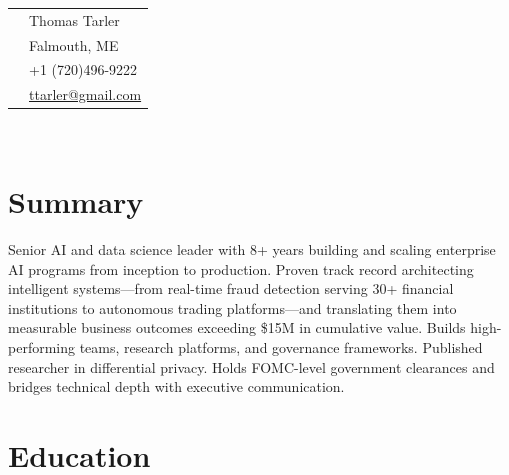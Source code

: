 \documentclass[9pt]{article} %
\begin{document}
\hfill
\begin{minipage}[t]{0.40\textwidth} %
\vspace{0pt} %


\colorbox{shade}{\textcolor{text}{
\begin{tabular}{c|p{5.5cm}}
\raisebox{-4pt}{} & Thomas Tarler \\ %
\raisebox{-4pt}{} & Falmouth, ME\\ %
\raisebox{-3pt}{} & +1 (720)496-9222 \\ %
\raisebox{-1pt}{} & \href{mailto:ttarler@gmail.com}{ttarler@gmail.com} \\ %
\end{tabular}
}
}\\[6pt]


\section{Summary} 

Senior AI and data science leader with 8+ years building and scaling enterprise AI programs from inception to production. Proven track record architecting intelligent systems---from real-time fraud detection serving 30+ financial institutions to autonomous trading platforms---and translating them into measurable business outcomes exceeding \$15M in cumulative value. Builds high-performing teams, research platforms, and governance frameworks. Published researcher in differential privacy. Holds FOMC-level government clearances and bridges technical depth with executive communication.

	

\section{Education} 

\begin{tabular}{rl} %


\end{tabular}
\end{minipage}
\end{document}
